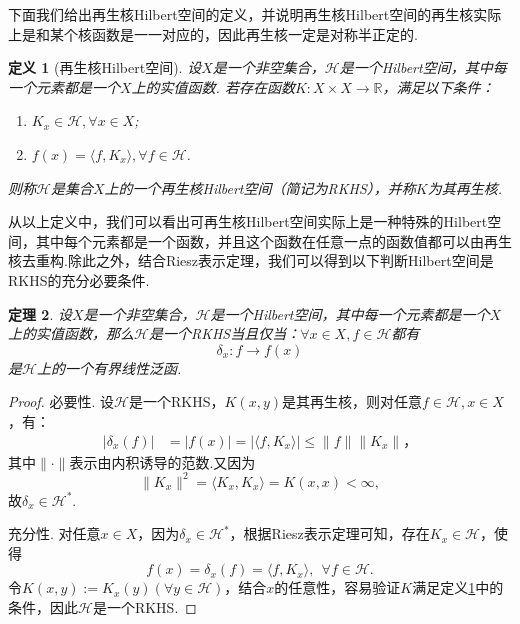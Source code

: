 \documentclass[12pt, a4paper, oneside]{ctexbook}
\newtheorem{theorem}{定理}[section]
\newtheorem{definition}[theorem]{定义}
\begin{document}
下面我们给出再生核Hilbert空间的定义，并说明再生核Hilbert空间的再生核实际上是和某个核函数是一一对应的，因此再生核一定是对称半正定的.
\begin{definition}[再生核Hilbert空间]\label{def:RKHS}
    设$X$是一个非空集合，$\mathcal{H}$是一个Hilbert空间，其中每一个元素都是一个$X$上的实值函数. 若存在函数$K:X\times X\to\mathbb{R}$，满足以下条件：
    \begin{enumerate}
        \item $K_x\in\mathcal{H},\forall x\in X$;
        \item $f(x)=\langle f,K_x\rangle,\forall f\in\mathcal{H}$.
    \end{enumerate}
    则称$\mathcal{H}$是集合$X$上的一个再生核Hilbert空间（简记为RKHS），并称$K$为其再生核.
\end{definition}

从以上定义中，我们可以看出可再生核Hilbert空间实际上是一种特殊的Hilbert空间，其中每个元素都是一个函数，并且这个函数在任意一点的函数值都可以由再生核去重构.除此之外，结合Riesz表示定理，我们可以得到以下判断Hilbert空间是RKHS的充分必要条件.

\begin{theorem}
    设$X$是一个非空集合，$\mathcal{H}$是一个Hilbert空间，其中每一个元素都是一个$X$上的实值函数，那么$\mathcal{H}$是一个RKHS当且仅当：$\forall x\in X,f\in\mathcal{H}$都有
    \begin{equation*}
        \delta_x:f\to f(x)
    \end{equation*}
    是$\mathcal{H}$上的一个有界线性泛函.
\end{theorem}

\begin{proof}
    必要性. 设$\mathcal{H}$是一个RKHS，$K(x,y)$是其再生核，则对任意$f\in\mathcal{H},x\in X$，有：
    \begin{align*}
        |\delta_x(f)|&=|f(x)|=|\langle f,K_x\rangle| \leq \|f\|\|K_x\|，
    \end{align*}
    其中$\|\cdot\|$表示由内积诱导的范数.又因为
    \begin{equation*}
        \|K_x\|^2=\langle K_x,K_x\rangle =K(x,x)<\infty,
    \end{equation*}
    故$\delta_x\in\mathcal{H}^*$.

    充分性. 对任意$x\in X$，因为$\delta_x\in\mathcal{H}^*$，根据Riesz表示定理可知，存在$K_x\in\mathcal{H}$，使得
    \begin{equation*}
        f(x)=\delta_x(f)=\langle f,K_x\rangle,~~\forall f\in\mathcal{H}.
    \end{equation*} 
    令$K(x,y):=K_x(y)(\forall y\in\mathcal{H})$，结合$x$的任意性，容易验证$K$满足定义\ref{def:RKHS}中的条件，因此$\mathcal{H}$是一个RKHS.
\end{proof}
\end{document}
